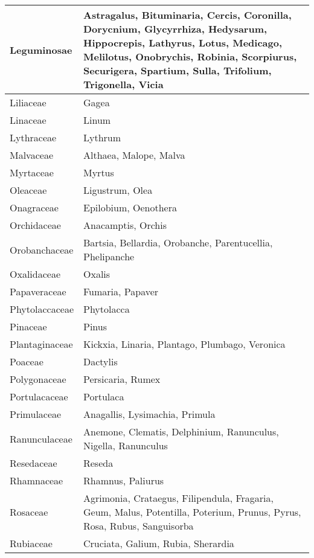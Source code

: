 \documentclass[main.tex]{subfiles}
\begin{document}
        \begin{table}[!ht]
        \centering
    \begin{tabular}[\footnotesize]{|p{3cm}|p{9cm}|}
    \hline 
        Leguminosae & Astragalus, Bituminaria, Cercis, Coronilla, Dorycnium, Glycyrrhiza, Hedysarum, Hippocrepis, Lathyrus, Lotus, Medicago, Melilotus, Onobrychis, Robinia, Scorpiurus, Securigera, Spartium, Sulla, Trifolium, Trigonella, Vicia \\ \hline
        Liliaceae & Gagea \\ \hline
        Linaceae & Linum \\ \hline
        Lythraceae & Lythrum \\ \hline
        Malvaceae & Althaea, Malope, Malva \\ \hline
        Myrtaceae & Myrtus \\ \hline
        Oleaceae & Ligustrum, Olea \\ \hline
        Onagraceae & Epilobium, Oenothera \\ \hline
        Orchidaceae & Anacamptis, Orchis \\ \hline
        Orobanchaceae & Bartsia, Bellardia, Orobanche, Parentucellia, Phelipanche \\ \hline
        Oxalidaceae & Oxalis \\ \hline
        Papaveraceae & Fumaria, Papaver \\ \hline
        Phytolaccaceae & Phytolacca \\ \hline
        Pinaceae & Pinus \\ \hline
        Plantaginaceae & Kickxia, Linaria, Plantago, Plumbago, Veronica \\ \hline
        Poaceae & Dactylis \\ \hline
        Polygonaceae & Persicaria, Rumex \\ \hline
        Portulacaceae & Portulaca \\ \hline
        Primulaceae & Anagallis, Lysimachia, Primula \\ \hline
        Ranunculaceae & Anemone, Clematis, Delphinium, Ranunculus, Nigella, Ranunculus \\ \hline
        Resedaceae & Reseda \\ \hline
        Rhamnaceae & Rhamnus, Paliurus \\ \hline
        Rosaceae & Agrimonia, Crataegus, Filipendula, Fragaria, Geum, Malus, Potentilla, Poterium, Prunus, Pyrus, Rosa, Rubus, Sanguisorba \\ \hline
        Rubiaceae & Cruciata, Galium, Rubia, Sherardia \\ \hline

\end{tabular}
\end{table}
\end{document}
